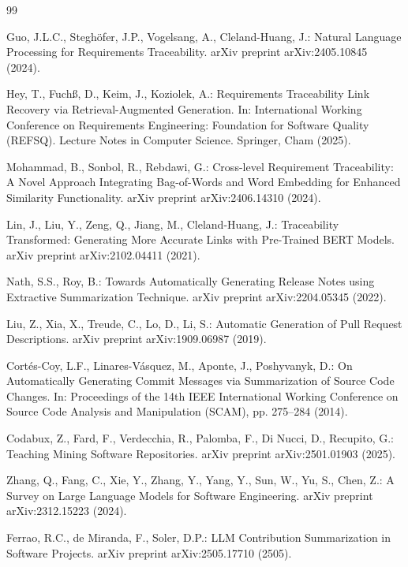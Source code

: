 \documentclass[runningheads]{llncs}
\begin{document}
\begin{thebibliography}{99}

Guo, J.L.C., Steghöfer, J.P., Vogelsang, A., Cleland-Huang, J.: Natural Language 
Processing for Requirements Traceability. arXiv preprint arXiv:2405.10845 (2024).

Hey, T., Fuchß, D., Keim, J., Koziolek, A.: Requirements Traceability Link 
Recovery via Retrieval-Augmented Generation. In: International Working 
Conference on Requirements Engineering: Foundation for Software Quality (REFSQ). 
Lecture Notes in Computer Science. Springer, Cham (2025).

Mohammad, B., Sonbol, R., Rebdawi, G.: Cross-level Requirement Traceability: 
A Novel Approach Integrating Bag-of-Words and Word Embedding for Enhanced 
Similarity Functionality. arXiv preprint arXiv:2406.14310 (2024).

Lin, J., Liu, Y., Zeng, Q., Jiang, M., Cleland-Huang, J.: Traceability 
Transformed: Generating More Accurate Links with Pre-Trained BERT Models. 
arXiv preprint arXiv:2102.04411 (2021).

Nath, S.S., Roy, B.: Towards Automatically Generating Release Notes using 
Extractive Summarization Technique. arXiv preprint arXiv:2204.05345 (2022).

Liu, Z., Xia, X., Treude, C., Lo, D., Li, S.: Automatic Generation of Pull 
Request Descriptions. arXiv preprint arXiv:1909.06987 (2019).

Cortés-Coy, L.F., Linares-Vásquez, M., Aponte, J., Poshyvanyk, D.: On
Automatically Generating Commit Messages via Summarization of Source Code Changes.
In: Proceedings of the 14th IEEE International Working Conference on Source Code
Analysis and Manipulation (SCAM), pp. 275--284 (2014).

Codabux, Z., Fard, F., Verdecchia, R., Palomba, F., Di Nucci, D., Recupito, G.: 
Teaching Mining Software Repositories. arXiv preprint arXiv:2501.01903 (2025).

Zhang, Q., Fang, C., Xie, Y., Zhang, Y., Yang, Y., Sun, W., Yu, S., Chen, Z.: 
A Survey on Large Language Models for Software Engineering. arXiv preprint 
arXiv:2312.15223 (2024).

Ferrao, R.C., de Miranda, F., Soler, D.P.: LLM Contribution Summarization 
in Software Projects. arXiv preprint arXiv:2505.17710 (2505).

\end{thebibliography}
\end{document}
